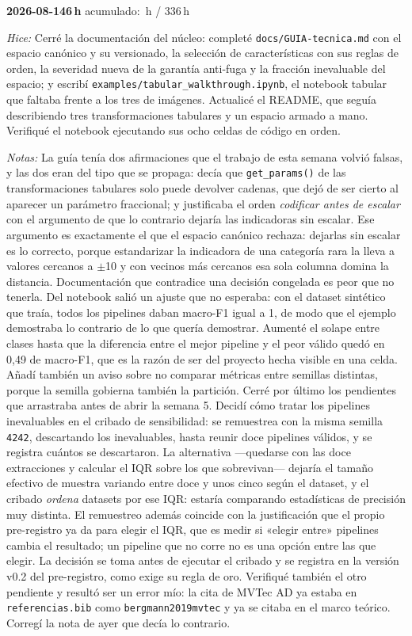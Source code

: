 \documentclass[11pt,letterpaper]{article}
\newcommand{\presupuesto}{336}
\newcommand{\horasacum}{0}
\newcommand{\entrada}[4]{%
  \xdef\horasacum{\fpeval{\horasacum + #2}}%
  \par\medskip
  \noindent\textbf{\color{tecnavy}#1}\quad\textbf{#2\,h}%
  \hfill{\small\color{gris}acumulado: \horasacum\,h / \presupuesto\,h}\par
  \nopagebreak
  \noindent\textit{Hice:} #3\par
  \nopagebreak
  \noindent\textit{Notas:} #4\par
}
\begin{document}
\entrada{2026-08-14}{6}
{Cerré la documentación del núcleo: completé \texttt{docs/GUIA-tecnica.md} con el espacio
 canónico y su versionado, la selección de características con sus reglas de orden, la
 severidad nueva de la garantía anti-fuga y la fracción inevaluable del espacio; y escribí
 \texttt{examples/tabular\_walkthrough.ipynb}, el notebook tabular que faltaba frente a los
 tres de imágenes. Actualicé el README, que seguía describiendo tres transformaciones
 tabulares y un espacio armado a mano. Verifiqué el notebook ejecutando sus ocho celdas de
 código en orden.}
{La guía tenía dos afirmaciones que el trabajo de esta semana volvió falsas, y las dos eran
 del tipo que se propaga: decía que \texttt{get\_params()} de las transformaciones tabulares
 solo puede devolver cadenas, que dejó de ser cierto al aparecer un parámetro fraccional; y
 justificaba el orden \emph{codificar antes de escalar} con el argumento de que lo contrario
 dejaría las indicadoras sin escalar. Ese argumento es exactamente el que el espacio
 canónico rechaza: dejarlas sin escalar es lo correcto, porque estandarizar la indicadora de
 una categoría rara la lleva a valores cercanos a $\pm$10 y con vecinos más cercanos esa
 sola columna domina la distancia. Documentación que contradice una decisión congelada es
 peor que no tenerla. Del notebook salió un ajuste que no esperaba: con el dataset sintético
 que traía, todos los pipelines daban macro-F1 igual a 1, de modo que el ejemplo demostraba
 lo contrario de lo que quería demostrar. Aumenté el solape entre clases hasta que la
 diferencia entre el mejor pipeline y el peor válido quedó en 0,49 de macro-F1, que es la
 razón de ser del proyecto hecha visible en una celda. Añadí también un aviso sobre no
 comparar métricas entre semillas distintas, porque la semilla gobierna también la
 partición. Cerré por último los pendientes que arrastraba antes de abrir la semana 5.
 Decidí cómo tratar los pipelines inevaluables en el cribado de sensibilidad: se remuestrea
 con la misma semilla \texttt{4242}, descartando los inevaluables, hasta reunir doce
 pipelines válidos, y se registra cuántos se descartaron. La alternativa —quedarse con las
 doce extracciones y calcular el IQR sobre los que sobrevivan— dejaría el tamaño efectivo
 de muestra variando entre doce y unos cinco según el dataset, y el cribado \emph{ordena}
 datasets por ese IQR: estaría comparando estadísticas de precisión muy distinta. El
 remuestreo además coincide con la justificación que el propio pre-registro ya da para
 elegir el IQR, que es medir si «elegir entre» pipelines cambia el resultado; un pipeline
 que no corre no es una opción entre las que elegir. La decisión se toma antes de ejecutar
 el cribado y se registra en la versión v0.2 del pre-registro, como exige su regla de oro.
 Verifiqué también el otro pendiente y resultó ser un error mío: la cita de MVTec AD ya
 estaba en \texttt{referencias.bib} como \texttt{bergmann2019mvtec} y ya se citaba en el
 marco teórico. Corregí la nota de ayer que decía lo contrario.}
\end{document}
